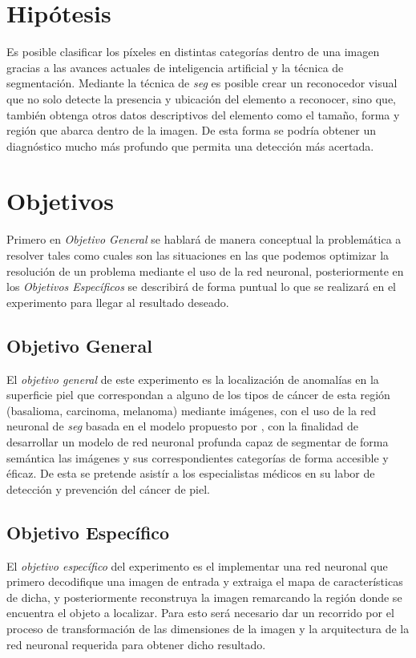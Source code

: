 \section{Hipótesis}
Es posible clasificar los píxeles en distintas categorías dentro de una imagen gracias a las avances actuales de inteligencia artificial y la técnica de segmentación. Mediante la técnica de \emph{\gls{seg}} es posible crear un reconocedor visual que no solo detecte la presencia y ubicación del elemento a reconocer, sino que, también obtenga otros datos descriptivos del elemento como el tamaño, forma y región que abarca dentro de la imagen. De esta forma se podría obtener un diagnóstico mucho más profundo que permita una detección más acertada.

\section{Objetivos}
Primero en \emph{Objetivo General} se hablará de manera conceptual la problemática a resolver tales como cuales son las situaciones en las que podemos optimizar la resolución de un problema mediante el uso de la red neuronal, posteriormente en los \emph{Objetivos Específicos} se describirá de forma puntual lo que se realizará en el experimento para llegar al resultado deseado.

\subsection{Objetivo General}
El \emph{objetivo general} de este experimento es la localización de anomalías en la superficie piel que correspondan a alguno de los tipos de cáncer de esta región (basalioma, carcinoma, melanoma) mediante imágenes, con el uso de la red neuronal de \emph{\gls{seg}} basada en el modelo propuesto por \citet{wu2019fastfcn}, con la finalidad de desarrollar un modelo de red neuronal profunda capaz de segmentar de forma semántica las imágenes y sus correspondientes categorías de forma accesible y éficaz. De esta se pretende asistír a los especialistas médicos en su labor de detección y prevención del cáncer de piel.

\subsection{Objetivo Específico}
El \emph{objetivo específico} del experimento es el implementar una red neuronal que primero decodifique una imagen de entrada y extraiga el mapa de características de dicha, y posteriormente reconstruya la imagen remarcando la región donde se encuentra el objeto a localizar. Para esto será necesario dar un recorrido por el proceso de transformación de las dimensiones de la imagen y la arquitectura de la red neuronal requerida para obtener dicho resultado.

